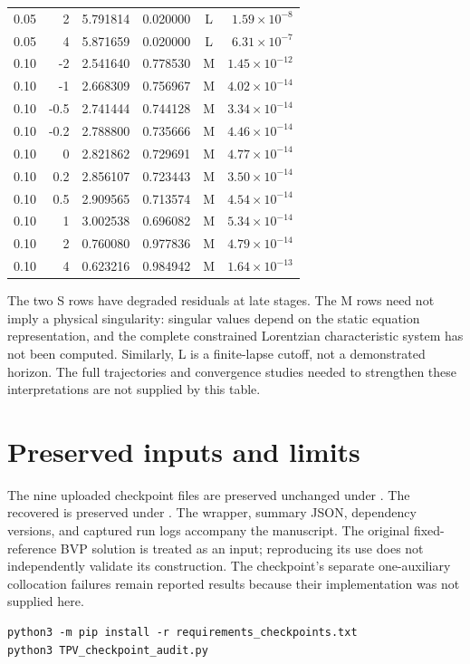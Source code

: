 \documentclass[11pt,oneside]{report}
\begin{document}
\begin{longtable}{rrrrcr}
0.05 & 2 & 5.791814 & 0.020000 & L & $1.59\times10^{-8}$\\
0.05 & 4 & 5.871659 & 0.020000 & L & $6.31\times10^{-7}$\\
0.10 & -2 & 2.541640 & 0.778530 & M & $1.45\times10^{-12}$\\
0.10 & -1 & 2.668309 & 0.756967 & M & $4.02\times10^{-14}$\\
0.10 & -0.5 & 2.741444 & 0.744128 & M & $3.34\times10^{-14}$\\
0.10 & -0.2 & 2.788800 & 0.735666 & M & $4.46\times10^{-14}$\\
0.10 & 0 & 2.821862 & 0.729691 & M & $4.77\times10^{-14}$\\
0.10 & 0.2 & 2.856107 & 0.723443 & M & $3.50\times10^{-14}$\\
0.10 & 0.5 & 2.909565 & 0.713574 & M & $4.54\times10^{-14}$\\
0.10 & 1 & 3.002538 & 0.696082 & M & $5.34\times10^{-14}$\\
0.10 & 2 & 0.760080 & 0.977836 & M & $4.79\times10^{-14}$\\
0.10 & 4 & 0.623216 & 0.984942 & M & $1.64\times10^{-13}$\\
\bottomrule\end{longtable}
The two S rows have degraded residuals at late stages. The M rows need not imply a physical singularity: singular values depend on the static equation representation, and the complete constrained Lorentzian characteristic system has not been computed. Similarly, L is a finite-lapse cutoff, not a demonstrated horizon. The full trajectories and convergence studies needed to strengthen these interpretations are not supplied by this table.

\section{Preserved inputs and limits}
The nine uploaded checkpoint files are preserved unchanged under . The recovered  is preserved under . The wrapper, summary JSON, dependency versions, and captured run logs accompany the manuscript. The original fixed-reference BVP solution is treated as an input; reproducing its use does not independently validate its construction. The checkpoint's separate one-auxiliary collocation failures remain reported results because their implementation was not supplied here.

\begin{Verbatim}[breaklines=true,fontsize=\small]
python3 -m pip install -r requirements_checkpoints.txt
python3 TPV_checkpoint_audit.py
\end{Verbatim}
\end{document}
